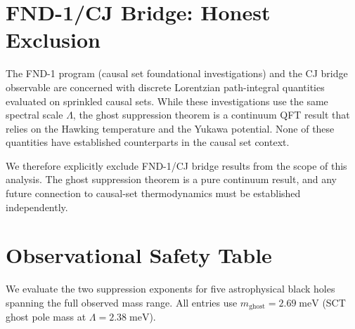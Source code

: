 \documentclass[11pt,a4paper]{article}
\newcommand{\mghost}{m_{\mathrm{ghost}}}
\theoremstyle{plain}
\theoremstyle{definition}
\begin{document}
\section{FND-1/CJ Bridge: Honest Exclusion}\label{sec:fnd1}

The FND-1 program (causal set foundational investigations) and the CJ
bridge observable are concerned with discrete Lorentzian path-integral
quantities evaluated on sprinkled causal sets.  While these
investigations use the same spectral scale $\Lambda$, the ghost
suppression theorem is a continuum QFT result that relies on the
Hawking temperature and the Yukawa potential.  None of these quantities
have established counterparts in the causal set context.

We therefore explicitly exclude FND-1/CJ bridge results from the
scope of this analysis.  The ghost suppression theorem is a pure
continuum result, and any future connection to causal-set
thermodynamics must be established independently.


\section{Observational Safety Table}\label{sec:observational}

We evaluate the two suppression exponents for five astrophysical
black holes spanning the full observed mass range.  All entries use
$\mghost = 2.69\;\mathrm{meV}$ (SCT ghost pole mass at
$\Lambda = 2.38\;\mathrm{meV}$).
\end{document}
